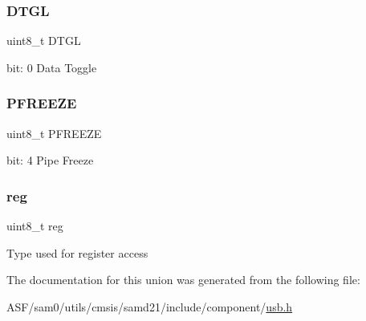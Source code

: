 \subsubsection{\texorpdfstring{DTGL}{DTGL}}
{\footnotesize\ttfamily uint8\+\_\+t D\+T\+GL}

bit\+: 0 Data Toggle \mbox{\label{union_u_s_b___h_o_s_t___p_s_t_a_t_u_s___type_a5e5a7a11855be531dd9c6eddc438572e}} 
\subsubsection{\texorpdfstring{PFREEZE}{PFREEZE}}
{\footnotesize\ttfamily uint8\+\_\+t P\+F\+R\+E\+E\+ZE}

bit\+: 4 Pipe Freeze \mbox{\label{union_u_s_b___h_o_s_t___p_s_t_a_t_u_s___type_a9428adc9af4653a2050e2536b55dec8d}} 
\subsubsection{\texorpdfstring{reg}{reg}}
{\footnotesize\ttfamily uint8\+\_\+t reg}

Type used for register access 

The documentation for this union was generated from the following file\+:\begin{DoxyCompactItemize}
\item 
A\+S\+F/sam0/utils/cmsis/samd21/include/component/\mbox{\hyperlink{component_2usb_8h}{usb.\+h}}\end{DoxyCompactItemize}
